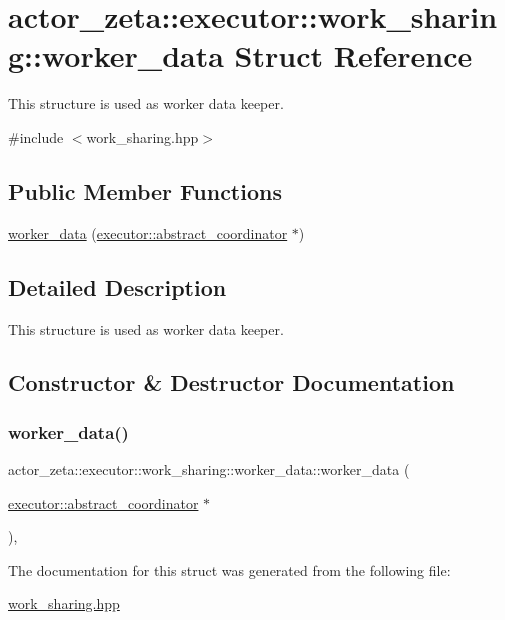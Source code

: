 \hypertarget{structactor__zeta_1_1executor_1_1work__sharing_1_1worker__data}{}\section{actor\+\_\+zeta\+:\+:executor\+:\+:work\+\_\+sharing\+:\+:worker\+\_\+data Struct Reference}
\label{structactor__zeta_1_1executor_1_1work__sharing_1_1worker__data}


This structure is used as worker data keeper.  




{\ttfamily \#include $<$work\+\_\+sharing.\+hpp$>$}

\subsection*{Public Member Functions}
\begin{DoxyCompactItemize}
\item 
\hyperlink{structactor__zeta_1_1executor_1_1work__sharing_1_1worker__data_ae810eed60fd71ef938993dbafb50d41d}{worker\+\_\+data} (\hyperlink{classactor__zeta_1_1executor_1_1abstract__coordinator}{executor\+::abstract\+\_\+coordinator} $\ast$)
\end{DoxyCompactItemize}


\subsection{Detailed Description}
This structure is used as worker data keeper. 

\subsection{Constructor \& Destructor Documentation}
\mbox{\label{structactor__zeta_1_1executor_1_1work__sharing_1_1worker__data_ae810eed60fd71ef938993dbafb50d41d}} 
\subsubsection{\texorpdfstring{worker\+\_\+data()}{worker\_data()}}
{\footnotesize\ttfamily actor\+\_\+zeta\+::executor\+::work\+\_\+sharing\+::worker\+\_\+data\+::worker\+\_\+data (\begin{DoxyParamCaption}\item[{\hyperlink{classactor__zeta_1_1executor_1_1abstract__coordinator}{executor\+::abstract\+\_\+coordinator} $\ast$}]{ }\end{DoxyParamCaption})\hspace{0.3cm}{\ttfamily [inline]}, {\ttfamily [explicit]}}



The documentation for this struct was generated from the following file\+:\begin{DoxyCompactItemize}
\item 
\hyperlink{work__sharing_8hpp}{work\+\_\+sharing.\+hpp}\end{DoxyCompactItemize}
